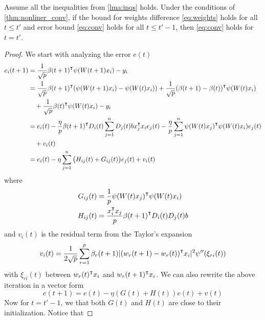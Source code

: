 \begin{lemma}
\label{lma:induction}
Assume all the inequalities from \cref{lma:inqs} holds. Under the conditions of \cref{thm:nonliner_conv}, if the bound for weights difference \eqref{eq:weights} holds for all $t\leq t'$ and error bound \eqref{eq:conv} holds for all $t\leq t'-1$, then \eqref{eq:conv} holds for $t=t'$.
\end{lemma}
\begin{proof}
We start with analyzing the error $e(t)$
\begin{equation*}
\begin{aligned}
    e_i(t+1)
    &= \frac{1}{\sqrt p}\beta(t+1)\transpose\psi(W(t+1)x_i) - y_i \\
    &= \frac{1}{\sqrt p}\beta(t+1)\transpose(\psi(W(t+1)x_i)-\psi(W(t)x_i))+ \frac{1}{\sqrt p}(\beta(t+1)-\beta(t))\transpose \psi(W(t)x_i) \\
    & \quad + \frac{1}{\sqrt p}\beta(t)\transpose \psi(W(t)x_i) - y_i \\
    &=e_i(t) - \frac{\eta}{p}\beta(t+1)\transpose D_i(t)\sum_{j=1}^nD_j(t)b x_j\transpose x_i e_j(t)  - \frac{\eta}{p}\sum_{j=1}^n\psi(W(t)x_j)\transpose\psi(W(t)x_i)e_j(t) \\
    & \quad + v_i(t) \\
    & = e_i(t)-\eta\sum_{j=1}^n\big(H_{ij}(t)+G_{ij}(t)\big)e_j(t) + v_i(t)
\end{aligned}
\end{equation*}
where
\begin{equation*}
\begin{aligned}
G_{ij}(t) &= \frac{1}{p}\psi(W(t)x_j)\transpose\psi(W(t)x_i) \\
H_{ij}(t) &= \frac{x_i\transpose x_j}{p}\beta(t+1)\transpose D_i(t)D_j(t)b
\end{aligned}
\end{equation*}
and $v_i(t)$ is the residual term from the Taylor's expansion
\begin{equation*}
    v_i(t) = \frac{1}{2\sqrt p}\sum_{r=1}^p\beta_r(t+1)|(w_r(t+1)-w_r(t))\transpose x_i|^2\psi''(\xi_{ri}(t))
\end{equation*}
with $\xi_{ri}(t)$ between $w_r(t)\transpose x_i$ and $w_r(t+1)\transpose x_i$. We can also rewrite the above iteration in a vector form
\begin{equation}\label{eq:et_iter}
     e(t+1) = e(t) - \eta(G(t)+H(t))e(t) + v(t)
\end{equation}
Now for $t=t'-1$, we that both $G(t)$ and $H(t)$ are close to their initialization. Notice that

\end{proof}
